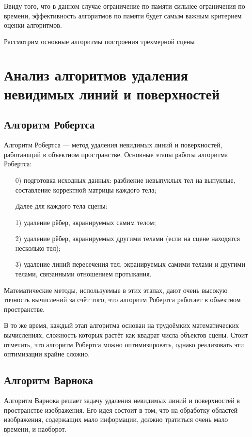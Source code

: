 Ввиду того, что в данном случае ограничение по памяти сильнее ограничения по времени, эффективность алгоритмов по памяти будет самым важным критерием оценки алгоритмов.

Рассмотрим основные алгоритмы построения трехмерной сцены \cite{Rogers}.

\section{Анализ алгоритмов удаления невидимых линий и поверхностей}
\subsection{Алгоритм Робертса}
Алгоритм Робертса --- метод удаления невидимых линий и поверхностей, работающий в объектном пространстве. Основные этапы работы алгоритма Робертса:
\begin{enumerate}
	\item[0)] подготовка исходных данных: разбиение невыпуклых тел на выпуклые, составление корректной матрицы каждого тела;
	\item[] Далее для каждого тела сцены:
	\item[1)] удаление рёбер, экранируемых самим телом;
	\item[2)] удаление рёбер, экранируемых другими телами (если на сцене находятся несколько тел);
	\item[3)] удаление линий пересечения тел, экранируемых самими телами и другими телами, связанными отношением протыкания.
\end{enumerate}

Математические методы, используемые в этих этапах, дают очень высокую точность вычислений за счёт того, что алгоритм Робертса работает в объектном пространстве. 

В то же время, каждый этап алгоритма основан на трудоёмких математических вычислениях, сложность которых растёт как квадрат числа объектов сцены. Стоит отметить, что алгоритм Робертса можно оптимизировать, однако реализовать эти оптимизации крайне сложно.

\subsection{Алгоритм Варнока}
Алгоритм Варнока решает задачу удаления невидимых линий и поверхностей в пространстве изображения. Его идея состоит в том, что на обработку областей изображения, содержащих мало информации, должно тратиться очень мало времени, и наоборот. 

